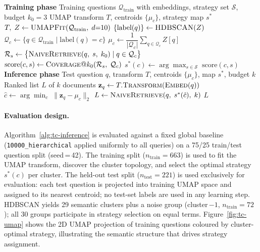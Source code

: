 \begin{algorithm}[htbp]
\caption{Task-Conditioned Indexing: Training \& Inference}
\label{alg:tc-inference}
\begin{algorithmic}[1]
\Statex \textbf{Training phase}
\Require Training questions $\mathcal{Q}_{\text{train}}$ with embeddings,
         strategy set $\mathcal{S}$, budget $k_0{=}3$
\Ensure  UMAP transform $T$, centroids $\{\mu_c\}$, strategy map $s^*$
\State $T,\; Z \leftarrow \textsc{UMAPFit}(\mathcal{Q}_{\text{train}},\; d{=}10)$
\State $\{\text{label}(q)\} \leftarrow \textsc{HDBSCAN}(Z)$
    \State $\mathcal{Q}_c \leftarrow \{q \in \mathcal{Q}_{\text{train}} \mid \text{label}(q) = c\}$
    \State $\mu_c \leftarrow \dfrac{1}{|\mathcal{Q}_c|}\displaystyle\sum_{q \in \mathcal{Q}_c} Z[q]$
        \State $\mathcal{R}_s \leftarrow \bigl\{\textsc{NaiveRetrieve}(q,\; s,\; k_0) \mid q \in \mathcal{Q}_c\bigr\}$
        \State $\text{score}(c, s) \leftarrow \textsc{Coverage@}k_0(\mathcal{R}_s,\; \mathcal{Q}_c)$
    \EndFor
    \State $s^*(c) \leftarrow \arg\max_{s \in \mathcal{S}}\; \text{score}(c, s)$
\EndFor
\Statex
\Statex \textbf{Inference phase}
\Require Test question $q$, transform $T$, centroids $\{\mu_c\}$, map $s^*$, budget $k$
\Ensure  Ranked list $L$ of $k$ documents
\State $\mathbf{z}_q \leftarrow T.\textsc{Transform}(\textsc{Embed}(q))$
\State $\hat{c} \leftarrow \arg\min_{c}\; \|\mathbf{z}_q - \mu_c\|_2$
\State $L \leftarrow \textsc{NaiveRetrieve}(q,\; s^*(\hat{c}),\; k)$
\State \Return $L$
\end{algorithmic}
\end{algorithm}

\paragraph{Evaluation design.}
Algorithm~\ref{alg:tc-inference} is evaluated against a fixed global baseline
(\texttt{10000\_hierarchical} applied uniformly to all queries) on a 75/25
train/test question split (seed\,=\,42).
The training split ($n_{\text{train}}{=}663$) is used to fit the UMAP transform,
discover the cluster topology, and select the optimal strategy $s^*(c)$ per cluster.
The held-out test split ($n_{\text{test}}{=}221$) is used exclusively for
evaluation: each test question is projected into training UMAP space and assigned
to its nearest centroid; no test-set labels are used in any learning step.
HDBSCAN yields 29 semantic clusters plus a noise group
(cluster\,$-1$, $n_{\text{train}}{=}72$); all 30 groups participate in
strategy selection on equal terms.
Figure~\ref{fig:tc-umap} shows the 2D UMAP projection of training questions
coloured by cluster-optimal strategy, illustrating the semantic structure
that drives strategy assignment.

